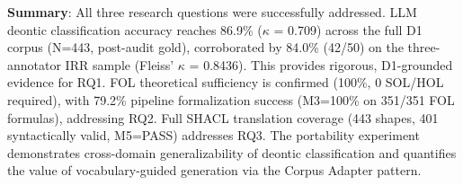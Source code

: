 \textbf{Summary}: All three research questions were successfully addressed. LLM deontic classification accuracy reaches 86.9\% ($\kappa$ = 0.709) across the full D1 corpus (N=443, post-audit gold), corroborated by 84.0\% (42/50) on the three-annotator IRR sample (Fleiss' $\kappa$ = 0.8436). This provides rigorous, D1-grounded evidence for RQ1. FOL theoretical sufficiency is confirmed (100\%, 0 SOL/HOL required), with 79.2\% pipeline formalization success (M3=100\% on 351/351 FOL formulas), addressing RQ2. Full SHACL translation coverage (443 shapes, 401 syntactically valid, M5=PASS) addresses RQ3. The portability experiment demonstrates cross-domain generalizability of deontic classification and quantifies the value of vocabulary-guided generation via the Corpus Adapter pattern.

